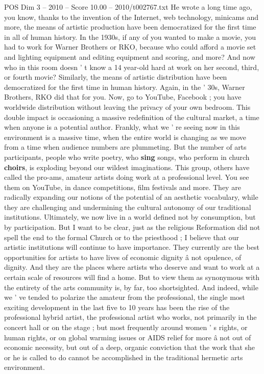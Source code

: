 \begin{textsample}{POS Dim 3 – 2010 – Score 10.00 – 2010/t002767.txt}
He wrote a long time ago, you know, thanks to the invention of the Internet, web technology, minicams and more, the means of artistic production have been democratized for the first time in all of human history.
In the 1930s, if any of you wanted to make a movie, you had to work for Warner Brothers or RKO, because who could afford a movie set and lighting equipment and editing equipment and scoring, and more?
And now who in this room doesn ' t know a 14 year-old hard at work on her second, third, or fourth movie?
Similarly, the means of artistic distribution have been democratized for the first time in human history.
Again, in the ' 30s, Warner Brothers, RKO did that for you.
Now, go to YouTube, Facebook ; you have worldwide distribution without leaving the privacy of your own bedroom.
This double impact is occasioning a massive redefinition of the cultural market, a time when anyone is a potential author.
Frankly, what we ' re seeing now in this environment is a massive time, when the entire world is changing as we move from a time when audience numbers are plummeting.
But the number of arts participants, people who write poetry, who \textbf{sing} songs, who perform in church \textbf{choirs}, is exploding beyond our wildest imaginations.
This group, others have called the pro-ams, amateur artists doing work at a professional level.
You see them on YouTube, in dance competitions, film festivals and more.
They are radically expanding our notions of the potential of an aesthetic vocabulary, while they are challenging and undermining the cultural autonomy of our traditional institutions.
Ultimately, we now live in a world defined not by consumption, but by participation.
But I want to be clear, just as the religious Reformation did not spell the end to the formal Church or to the priesthood ; I believe that our artistic institutions will continue to have importance.
They currently are the best opportunities for artists to have lives of economic dignity â not opulence, of dignity.
And they are the places where artists who deserve and want to work at a certain scale of resources will find a home.
But to view them as synonymous with the entirety of the arts community is, by far, too shortsighted.
And indeed, while we ' ve tended to polarize the amateur from the professional, the single most exciting development in the last five to 10 years has been the rise of the professional hybrid artist, the professional artist who works, not primarily in the concert hall or on the stage ; but most frequently around women ' s rights, or human rights, or on global warming issues or AIDS relief for more â not out of economic necessity, but out of a deep, organic conviction that the work that she or he is called to do cannot be accomplished in the traditional hermetic arts environment.

\end{textsample}
